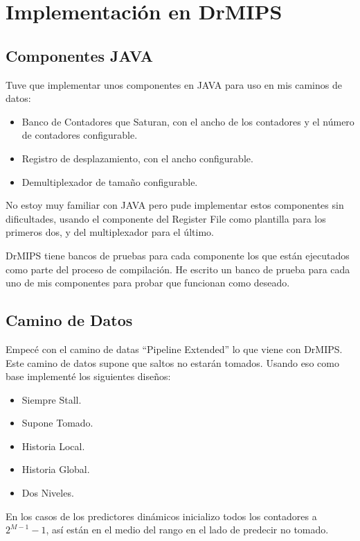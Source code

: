 \documentclass[a4paper]{article}
\begin{document}
\section{Implementación en DrMIPS}

\subsection{Componentes JAVA}

Tuve que implementar unos componentes en JAVA para uso en mis caminos de datos:

\begin{itemize}
    \item Banco de Contadores que Saturan, con el ancho de los contadores y el número de contadores configurable.
    \item Registro de desplazamiento, con el ancho configurable.
    \item Demultiplexador de tamaño configurable.
\end{itemize}

No estoy muy familiar con JAVA pero pude implementar estos componentes sin dificultades, usando el componente del Register File como plantilla para los primeros dos, y del multiplexador para el último.

DrMIPS tiene bancos de pruebas para cada componente los que están ejecutados como parte del proceso de compilación. He escrito un banco de prueba para cada uno de mis componentes para probar que funcionan como deseado.

\subsection{Camino de Datos}

Empecé con el camino de datas ``Pipeline Extended'' lo que viene con DrMIPS. Este camino de datos supone que saltos no estarán tomados. Usando eso como base implementé los siguientes diseños:

\begin{itemize}
    \item Siempre Stall.
    \item Supone Tomado.
    \item Historia Local.
    \item Historia Global.
    \item Dos Niveles.
\end{itemize}

En los casos de los predictores dinámicos inicializo todos los contadores a $2^{M-1} - 1$, así están en el medio del rango en el lado de predecir no tomado.
\end{document}
